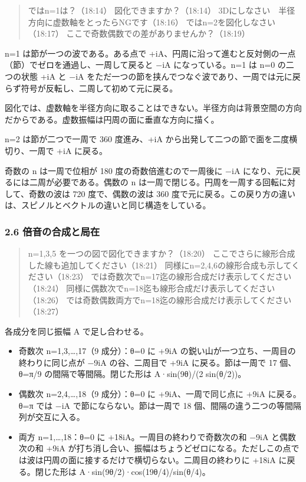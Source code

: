 \documentclass[
  a4paper,
]{ltjsarticle}
\providecommand{\tightlist}{%
  \setlength{\itemsep}{0pt}\setlength{\parskip}{0pt}}
\begin{document}
\begin{quote}
ではn=1は？（18:14） 図化できますか？（18:14）
3Dにしなさい　半径方向に虚数軸をとったらNGです（18:16）
ではn=2を図化しなさい（18:17）
ここで奇数偶数での差がありませんか？（18:19）
\end{quote}

n=1 は節が一つの波である。ある点で
+iA、円周に沿って進むと反対側の一点（節）でゼロを通過し、一周して戻ると
−iA になっている。n=1 は n=0 の二つの状態 +iA と −iA
をただ一つの節を挟んでつなぐ波であり、一周では元に戻らず符号が反転し、二周して初めて元に戻る。

図化では、虚数軸を半径方向に取ることはできない。半径方向は背景空間の方向だからである。虚数振幅は円周の面に垂直な方向に描く。

n=2 は節が二つで一周で 360 度進み、+iA
から出発して二つの節で面を二度横切り、一周で +iA に戻る。

奇数の n は一周で位相が 180 度の奇数倍進むので一周後に −iA
になり、元に戻るには二周が必要である。偶数の n
は一周で閉じる。円周を一周する回転に対して、奇数の波は 720
度で、偶数の波は 360
度で元に戻る。この戻り方の違いは、スピノルとベクトルの違いと同じ構造をしている。

\subsubsection{2.6
倍音の合成と局在}\label{ux500dux97f3ux306eux5408ux6210ux3068ux5c40ux5728}

\begin{quote}
n=1,3,5 を一つの図で図化できますか？（18:20）
ここでさらに線形合成した線も追加してください（18:21）
同様にn=2,4,6の線形合成も示してください（18:23）
では奇数次でn=17迄の線形合成だけ表示してください（18:24）
同様に偶数次でn=18迄も線形合成だけ表示してください（18:26）
では奇数偶数両方でn=18迄の線形合成だけ表示してください（18:27）
\end{quote}

各成分を同じ振幅 A で足し合わせる。

\begin{itemize}
\tightlist
\item
  奇数次 n=1,3,\ldots,17（9 成分）：θ=0 に +9iA
  の鋭い山が一つ立ち、一周目の終わりに同じ点が −9iA の谷、二周目で +9iA
  に戻る。節は一周で 17 個、θ=π/9 の間隔で等間隔。閉じた形は
  A·sin(9θ)/(2 sin(θ/2))。
\item
  偶数次 n=2,4,\ldots,18（9 成分）：θ=0 に +9iA、一周で同じ点に +9iA
  に戻る。θ=π では −iA で節にならない。節は一周で 18
  個、間隔の違う二つの等間隔列が交互に入る。
\item
  両方 n=1,\ldots,18：θ=0 に +18iA。一周目の終わりで奇数次の和 −9iA
  と偶数次の和 +9iA
  が打ち消し合い、振幅はちょうどゼロになる。ただしこの点では波は円周の面に接するだけで横切らない。二周目の終わりに
  +18iA に戻る。閉じた形は A·sin(9θ/2)·cos(19θ/4)/sin(θ/4)。
\end{itemize}
\end{document}
